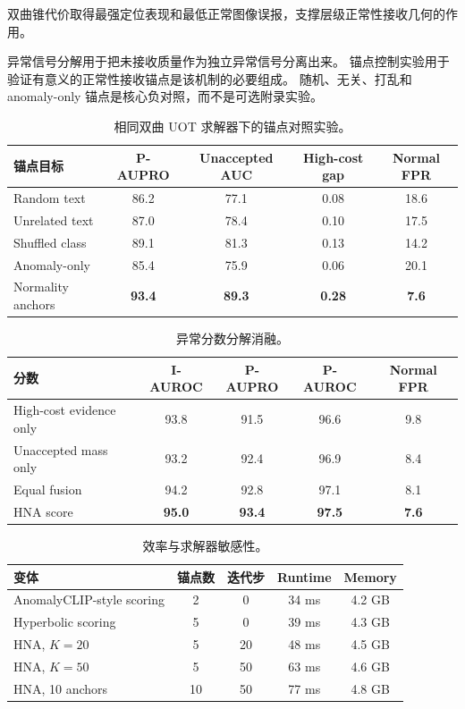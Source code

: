 \documentclass[10pt,fontset=none]{ctexart}
\newcommand{\method}{HNA}
\begin{document}
双曲锥代价取得最强定位表现和最低正常图像误报，支撑层级正常性接收几何的作用。

异常信号分解用于把未接收质量作为独立异常信号分离出来。
锚点控制实验用于验证有意义的正常性接收锚点是该机制的必要组成。
随机、无关、打乱和 anomaly-only 锚点是核心负对照，而不是可选附录实验。

\begin{table}[t]
\centering
\caption{相同双曲 UOT 求解器下的锚点对照实验。}
\label{tab:anchor}
\begin{tabular}{lcccc}
\toprule
锚点目标 & P-AUPRO & Unaccepted AUC & High-cost gap & Normal FPR \\
\midrule
Random text & 86.2 & 77.1 & 0.08 & 18.6 \\
Unrelated text & 87.0 & 78.4 & 0.10 & 17.5 \\
Shuffled class & 89.1 & 81.3 & 0.13 & 14.2 \\
Anomaly-only & 85.4 & 75.9 & 0.06 & 20.1 \\
Normality anchors & \textbf{93.4} & \textbf{89.3} & \textbf{0.28} & \textbf{7.6} \\
\bottomrule
\end{tabular}
\end{table}

\begin{table}[t]
\centering
\caption{异常分数分解消融。}
\label{tab:score}
\begin{tabular}{lcccc}
\toprule
分数 & I-AUROC & P-AUPRO & P-AUROC & Normal FPR \\
\midrule
High-cost evidence only & 93.8 & 91.5 & 96.6 & 9.8 \\
Unaccepted mass only & 93.2 & 92.4 & 96.9 & 8.4 \\
Equal fusion & 94.2 & 92.8 & 97.1 & 8.1 \\
\method{} score & \textbf{95.0} & \textbf{93.4} & \textbf{97.5} & \textbf{7.6} \\
\bottomrule
\end{tabular}
\end{table}

\begin{table}[t]
\centering
\caption{效率与求解器敏感性。}
\label{tab:efficiency}
\begin{tabular}{lcccc}
\toprule
变体 & 锚点数 & 迭代步 & Runtime & Memory \\
\midrule
AnomalyCLIP-style scoring & 2 & 0 & 34 ms & 4.2 GB \\
Hyperbolic scoring & 5 & 0 & 39 ms & 4.3 GB \\
\method{}, $K{=}20$ & 5 & 20 & 48 ms & 4.5 GB \\
\method{}, $K{=}50$ & 5 & 50 & 63 ms & 4.6 GB \\
\method{}, 10 anchors & 10 & 50 & 77 ms & 4.8 GB \\
\bottomrule
\end{tabular}
\end{table}
\end{document}

